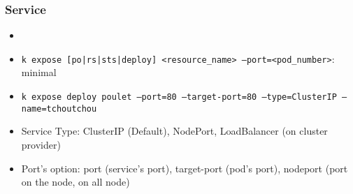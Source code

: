 
\subsubsection{Service}
\begin{frame}[fragile]{\subsubsecname}
  \begin{itemize}
    \item
    \item \texttt{k expose [po|rs|sts|deploy] <resource\_name> --port=<pod\_number>}: minimal
    \item \texttt{k expose deploy poulet --port=80 --target-port=80 --type=ClusterIP --name=tchoutchou}
  \end{itemize}
  \begin{itemize}
    \item Service Type: ClusterIP (Default), NodePort, LoadBalancer (on cluster provider)
    \item Port's option: port (service's port), target-port (pod's port), nodeport (port on the node, on all node)
  \end{itemize}
  \begin{lstlisting}
  \end{lstlisting}
\end{frame}
